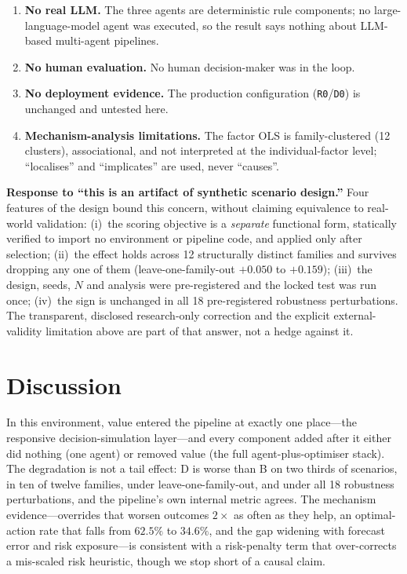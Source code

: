 \documentclass[conference]{IEEEtran}
\newcommand{\code}[1]{\texttt{#1}}
\begin{document}
\begin{enumerate}
        estimate (median absolute error $0.084$ on development data; 0\% fallback
        on the locked run) and is biased mild in the two censored-demand
        families, which are exactly the families where D helps.
  \item \textbf{No real LLM.} The three agents are deterministic rule
        components; no large-language-model agent was executed, so the result
        says nothing about LLM-based multi-agent pipelines.
  \item \textbf{No human evaluation.} No human decision-maker was in the loop.
  \item \textbf{No deployment evidence.} The production configuration
        (\code{R0}/\code{D0}) is unchanged and untested here.
  \item \textbf{Mechanism-analysis limitations.} The factor OLS is
        family-clustered (12 clusters), associational, and not interpreted at the
        individual-factor level; ``localises'' and ``implicates'' are used, never
        ``causes''.
\end{enumerate}

\textbf{Response to ``this is an artifact of synthetic scenario design.''}
Four features of the design bound this concern, without claiming equivalence to
real-world validation: (i)~the scoring objective is a \emph{separate} functional
form, statically verified to import no environment or pipeline code, and applied
only after selection; (ii)~the effect holds across 12 structurally distinct
families and survives dropping any one of them (leave-one-family-out
$+0.050$ to $+0.159$); (iii)~the design, seeds, $N$ and analysis were
pre-registered and the locked test was run once; (iv)~the sign is unchanged in
all 18 pre-registered robustness perturbations. The transparent, disclosed
research-only correction and the explicit external-validity limitation above are
part of that answer, not a hedge against it.

\section{Discussion}\label{sec:disc}
In this environment, value entered the pipeline at exactly one place---the
responsive decision-simulation layer---and every component added after it either
did nothing (one agent) or removed value (the full agent-plus-optimiser stack).
The degradation is not a tail effect: D is worse than B on two thirds of
scenarios, in ten of twelve families, under leave-one-family-out, and under all
18 robustness perturbations, and the pipeline's own internal metric agrees. The
mechanism evidence---overrides that worsen outcomes $2\times$ as often as they
help, an optimal-action rate that falls from $62.5\%$ to $34.6\%$, and the gap
widening with forecast error and risk exposure---is consistent with a
risk-penalty term that over-corrects a mis-scaled risk heuristic, though we stop
short of a causal claim.
\end{document}
